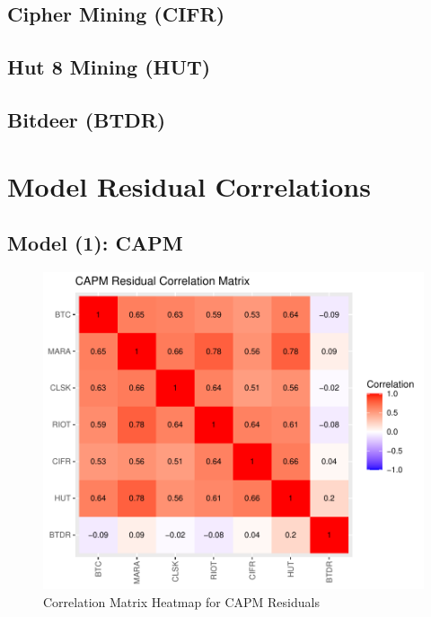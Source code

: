\documentclass[]{article}
\begin{document}


\pagebreak

\subsection{Cipher Mining (CIFR)}



\pagebreak

\subsection{Hut 8 Mining (HUT)}



\pagebreak

\subsection{Bitdeer (BTDR)}



\pagebreak

\section{Model Residual Correlations}

\subsection{Model (1): CAPM}

\begin{figure}[htbp]
	\label{capm_resid_corplot}
	\caption{Correlation Matrix Heatmap for CAPM Residuals}
	\includegraphics[width=\linewidth]{capm_resid_corplot.pdf}
\end{figure}
\end{document}
